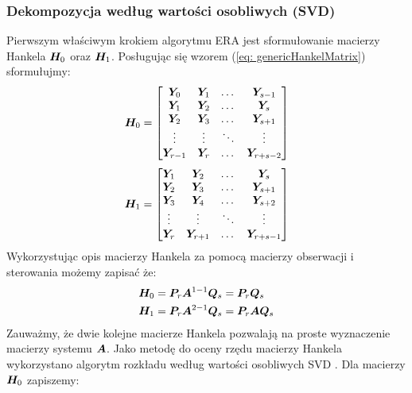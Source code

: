 \subsubsection{Dekompozycja według wartości osobliwych (SVD)}
Pierwszym właściwym krokiem algorytmu ERA jest sformułowanie macierzy Hankela $\bm{H}_0$ oraz $\bm{H}_1$. Posługując się wzorem (\ref{eq: genericHankelMatrix}) sformułujmy:
\begin{equation} \label{eq: HankelMatrixZero}
		\bm{H}_0 =\begin{bmatrix}
			\bm{Y}_0		&	\bm{Y}_{1} 	& \dots	& \bm{Y}_{s-1} \\
			\bm{Y}_1		&	\bm{Y}_{2}	& \dots	& \bm{Y}_{s} \\
			\bm{Y}_2		&	\bm{Y}_{3} 	& \dots	& \bm{Y}_{s+1} \\	
			\vdots			&	\vdots			& \ddots & \vdots\\
			\bm{Y}_{r-1}	&	\bm{Y}_{r} 	& \dots	& \bm{Y}_{r+s-2} 	
		\end{bmatrix} 
\end{equation}
\begin{equation} \label{eq: HankelMatrixShift}
	\bm{H}_1 =\begin{bmatrix}
		\bm{Y}_1		&	\bm{Y}_{2} 	& \dots	& \bm{Y}_{s} \\
		\bm{Y}_2		&	\bm{Y}_{3}	& \dots	& \bm{Y}_{s+1} \\
		\bm{Y}_3		&	\bm{Y}_{4} 	& \dots	& \bm{Y}_{s+2} \\	
		\vdots			&	\vdots			& \ddots & \vdots\\
		\bm{Y}_{r}	&	\bm{Y}_{r+1} 	& \dots	& \bm{Y}_{r+s-1} 	
	\end{bmatrix} 
\end{equation}
Wykorzystując opis macierzy Hankela za pomocą macierzy obserwacji i sterowania możemy zapisać że:
\begin{equation}
	\begin{split}
	\bm{H}_0 &= \bm{P}_r \bm{A}^{1-1}\bm{Q}_s=\bm{P}_r\bm{Q}_s \\
	\bm{H}_1 &= \bm{P}_r \bm{A}^{2-1}\bm{Q}_s=\bm{P}_r\bm{A}\bm{Q}_s \\
	\end{split}
\end{equation}
Zauważmy, że dwie kolejne macierze Hankela pozwalają na proste wyznaczenie macierzy systemu $\bm{A}$. 
Jako metodę do oceny rzędu macierzy Hankela wykorzystano algorytm rozkładu według wartości osobliwych SVD . Dla macierzy $\bm{H}_0$ zapiszemy:
